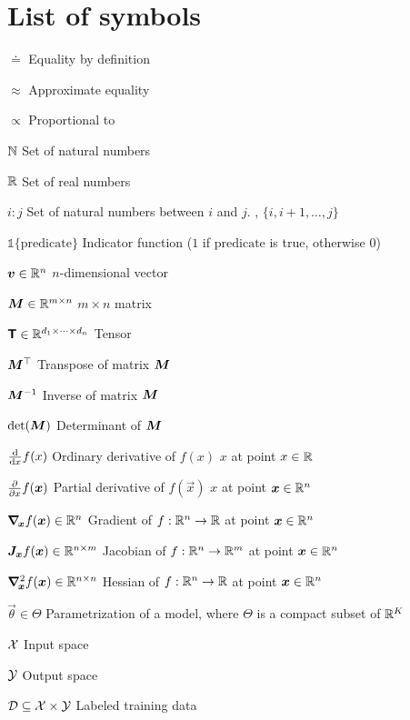 \section*{List of symbols}

\vspace{10mm}

\begin{abbrv}
    \item[$\doteq$] Equality by definition
    \item[$\approx$] Approximate equality
    \item[$\propto$] Proportional to
    \item[$\N$] Set of natural numbers
    \item[$\R$] Set of real numbers
    \item[$i:j$] Set of natural numbers between $i$ and $j$. \Ie, $\{i, i+1,\ldots,j\}$
    \item[$\mathbb{1}\{\mathrm{predicate}\}$] Indicator function ($1$ if $\mathrm{predicate}$ is true, otherwise $0$)

    \item

    \item[$\vec{v} \in \R^n$] $n$-dimensional vector
    \item[$\mat{M} \in \R^{m\times n}$] $m \times n$ matrix
    \item[$\tens{T} \in \R^{d_1 \times \cdots \times d_n}$] Tensor
    \item[$\transpose{\mat{M}}$] Transpose of matrix $\mat{M}$
    \item[$\inv{\mat{M}}$] Inverse of matrix $\mat{M}$
    \item[$\det{\mat{M}}$] Determinant of $\mat{M}$

    \item

    \item[$\odv*{f(x)}{x}$] Ordinary derivative of $f(x)$ \wrt $x$ at point $x\in\R$
    \item[$\pdv*{f(\vec{x})}{x}$] Partial derivative of $f(\vec{x})$ \wrt $x$ at point $\vec{x}\in\R^n$
    \item[$\grad{f(\vec{x})}{\vec{x}} \in \R^n$] Gradient of $f: \R^n \to \R$ at point $\vec{x}\in\R^n$
    \item[$\jacob{f(\vec{x})}{\vec{x}} \in \R^{n\times m}$] Jacobian of $f: \R^n \to \R^m$ at point $\vec{x}\in\R^n$
    \item[$\hess{f(\vec{x})}{\vec{x}} \in \R^{n\times n}$] Hessian of $f: \R^n \to \R$ at point $\vec{x}\in\R^n$

    \item

    \item[$\vec{\theta} \in \Theta$] Parametrization of a model, where $\Theta$ is a compact subset of $\R^K$
    \item[$\X$] Input space
    \item[$\Y$] Output space
    \item[$\mathcal{D} \subseteq \X \times \Y$] Labeled training data

\end{abbrv}
